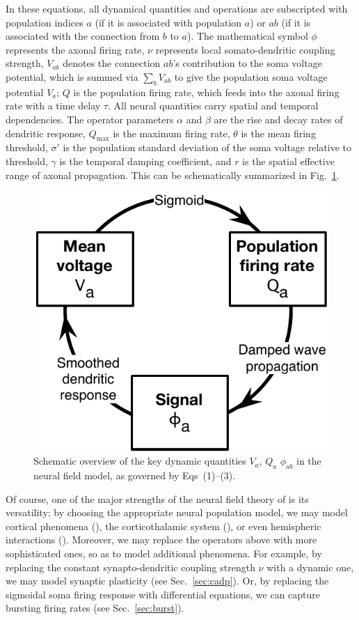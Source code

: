 \documentclass[preprint,review,10pt,authoryear,letterpaper]{elsarticle}
\begin{document}
In these equations, all dynamical quantities and operations are subscripted with population indices \(a\) (if it is associated with population \(a\)) or \(ab\) (if it is associated with the connection from \(b\) to \(a\)). The mathematical symbol \(\phi\) represents the axonal firing rate, \(\nu\) represents local somato-dendritic coupling strength, \(V_{ab}\) denotes the connection \(ab\)'s contribution to the soma voltage potential, which is summed via \(\sum_b V_{ab}\) to give the population soma voltage potential \(V_a\); \(Q\) is the population firing rate, which feeds into the axonal firing rate with a time delay \(\tau\). All neural quantities carry spatial and temporal dependencies. The operator parameters \(\alpha\) and \(\beta\) are the rise and decay rates of dendritic response, \(Q_\textrm{max}\) is the maximum firing rate, \(\theta\) is the mean firing threshold, \(\sigma'\) is the population standard deviation of the soma voltage relative to threshold, \(\gamma\) is the temporal damping coefficient, and \(r\) is the spatial effective range of axonal propagation. This can be schematically summarized in Fig.~\ref{fig:eirs_cycle}.

\begin{figure}[ht]
\begin{center}
\includegraphics[width=0.40\columnwidth]{EIRS_cycle}
\caption{Schematic overview of the key dynamic quantities \(V_a\), \(Q_a\) \(\phi_{ab}\) in the neural field model, as governed by Eqs~(1)--(3).}
\label{fig:eirs_cycle}
\end{center}
\end{figure}

Of course, one of the major strengths of the neural field theory of \citet{Robinson2005} is its versatility: by choosing the appropriate neural population model, we may model cortical phenomena (), the corticothalamic system (), or even hemispheric interactions (). Moreover, we may replace the operators above with more sophisticated ones, so as to model additional phenomena. For example, by replacing the constant synapto-dendritic coupling strength \(\nu\) with a dynamic one, we may model synaptic plasticity (see Sec.~\ref{sec:cadp}). Or, by replacing the sigmoidal soma firing response with differential equations, we can capture bursting firing rates (see Sec.~\ref{sec:burst}).
\end{document}
